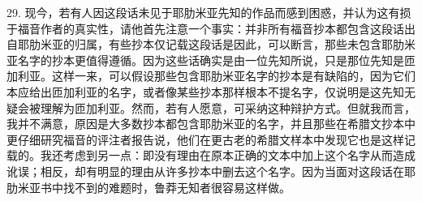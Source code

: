 29. 现今，若有人因这段话未见于耶肋米亚先知的作品而感到困惑，并认为这有损于福音作者的真实性，请他首先注意一个事实：并非所有福音抄本都包含这段话出自耶肋米亚的归属，有些抄本仅记载这段话是因此，可以断言，那些未包含耶肋米亚名字的抄本更值得遵循。因为这些话确实是由一位先知所说，只是那位先知是匝加利亚。这样一来，可以假设那些包含耶肋米亚名字的抄本是有缺陷的，因为它们本应给出匝加利亚的名字，或者像某些抄本那样根本不提名字，仅说明是这先知无疑会被理解为匝加利亚。然而，若有人愿意，可采纳这种辩护方式。但就我而言，我并不满意，原因是大多数抄本都包含耶肋米亚的名字，并且那些在希腊文抄本中更仔细研究福音的评注者报告说，他们在更古老的希腊文样本中发现它也是这样记载的。我还考虑到另一点：即没有理由在原本正确的文本中加上这个名字从而造成讹误；相反，却有明显的理由从许多抄本中删去这个名字。因为当面对这段话在耶肋米亚书中找不到的难题时，鲁莽无知者很容易这样做。\par

